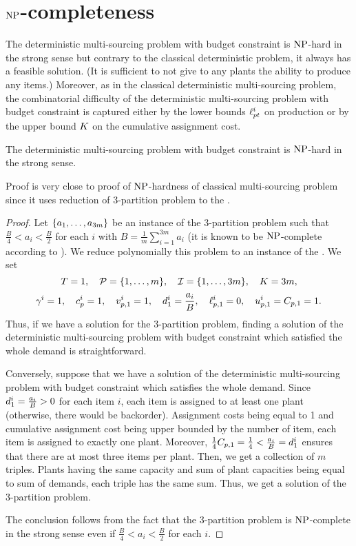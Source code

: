 \section{$\operatorname{NP}$-completeness}
\label{sec:multi-sourcing-limited-capital:NP-completeness}


The deterministic multi-sourcing problem with budget constraint is $\operatorname{NP}$-hard in the strong sense but contrary to the classical deterministic problem, it always has a feasible solution.
(It is sufficient to not give to any plants the ability to produce any items.)
Moreover, as in the classical deterministic multi-sourcing problem, the combinatorial difficulty of the deterministic multi-sourcing problem with budget constraint is captured either by the lower bounds $\ell_{pt}^i$ on production or by the upper bound $K$ on the cumulative assignment cost.


\begin{thm}\label{thm:det-multi-sourcing:limited-capital:strong-NP-hard}
  The deterministic multi-sourcing problem with budget constraint is $\operatorname{NP}$-hard in the strong sense.
\end{thm}


Proof is very close to proof of $\operatorname{NP}$-hardness of classical multi-sourcing problem since it uses reduction of 3-partition problem to the \tbc.


\begin{proof}
Let $\crbracket{a_1,\ldots,a_{3m}}$ be an instance of the 3-partition problem such that $\frac{B}{4} < a_i < \frac{B}{2}$ for each $i$ with $B=\frac{1}{m}\sum_{i=1}^{3m}a_i$ (it is known to be $\operatorname{NP}$-complete according to \citet{Garey1979}).
We reduce polynomially this problem to an instance of the \tbc.
We set
$$
  \horizon=1
  ,\quad
  \plants=\range[1]{m}
  ,\quad
  \REF=\range[1]{3m}
  ,\quad
  \capital = 3m,
$$
$$
  \gamma^i=1
  ,\quad
  c_p^i=1
  ,\quad
  v_{p,1}^i=1
  ,\quad
  d_1^i=\frac{a_i}{B}
  ,\quad
  \ell_{p,1}^i=0
  ,\quad
  u_{p,1}^i=C_{p,1}=1.
$$
Thus, if we have a solution for the 3-partition problem, finding a solution of the deterministic multi-sourcing problem with budget constraint which satisfied the whole demand is straightforward.

Conversely, suppose that we have a solution of the deterministic multi-sourcing problem with budget constraint which satisfies the whole demand.
Since $d_1^i=\frac{a_i}{B}>0$ for each item $i$, each item is assigned to at least one plant (otherwise, there would be backorder).
Assignment costs being equal to 1 and cumulative assignment cost being upper bounded by the number of item, each item is assigned to exactly one plant.
Moreover, $\frac{1}{4}C_{p,1}=\frac{1}{4} < \frac{a_i}{B}=d_1^i$ ensures that there are at most three items per plant.
Then, we get a collection of $m$ triples.
Plants having the same capacity and sum of plant capacities being equal to sum of demands, each triple has the same sum.
Thus, we get a solution of the 3-partition problem.

The conclusion follows from the fact that the 3-partition problem is $\operatorname{NP}$-complete in the strong sense even if $\frac{B}{4} < a_i < \frac{B}{2}$ for each $i$.
\end{proof}


